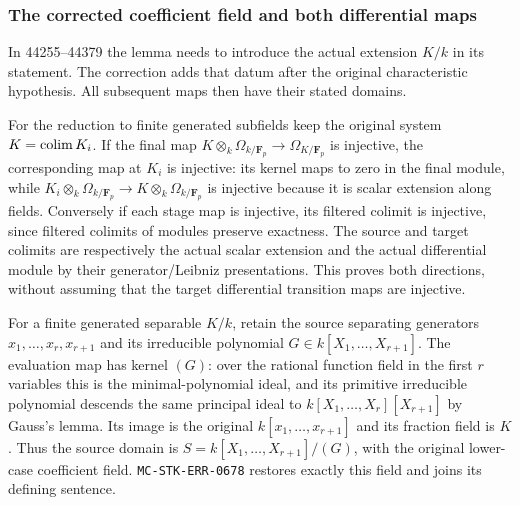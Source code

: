 \subsubsection{The corrected coefficient field and both differential maps}\label{algebra-proof-063-the-corrected-coefficient-field-and-both-differential-maps}

In 44255--44379 the lemma needs to introduce the actual extension \(K/k\) in its statement. The correction adds that datum after the original characteristic hypothesis. All subsequent maps then have their stated domains.

For the reduction to finite generated subfields keep the original system \(K=\mathop{\rm colim}K_i\). If the final map \(K\otimes_k\Omega_{k/\mathbf F_p}\to\Omega_{K/\mathbf F_p}\) is injective, the corresponding map at \(K_i\) is injective: its kernel maps to zero in the final module, while \(K_i\otimes_k\Omega_{k/\mathbf F_p}\to K\otimes_k\Omega_{k/\mathbf F_p}\) is injective because it is scalar extension along fields. Conversely if each stage map is injective, its filtered colimit is injective, since filtered colimits of modules preserve exactness. The source and target colimits are respectively the actual scalar extension and the actual differential module by their generator/Leibniz presentations. This proves both directions, without assuming that the target differential transition maps are injective.

For a finite generated separable \(K/k\), retain the source separating generators \(x_1,\ldots,x_r,x_{r+1}\) and its irreducible polynomial \(G\in k[X_1,\ldots,X_{r+1}]\). The evaluation map has kernel \((G)\): over the rational function field in the first \(r\) variables this is the minimal-polynomial ideal, and its primitive irreducible polynomial descends the same principal ideal to \(k[X_1,\ldots,X_r][X_{r+1}]\) by Gauss's lemma. Its image is the original \(k[x_1,\ldots,x_{r+1}]\) and its fraction field is \(K\). Thus the source domain is \(S=k[X_1,\ldots,X_{r+1}]/(G)\), with the original lower-case coefficient field. \texttt{MC-\AlgebraIdentifierBreak{}STK-\AlgebraIdentifierBreak{}ERR-\AlgebraIdentifierBreak{}0678} restores exactly this field and joins its defining sentence.

